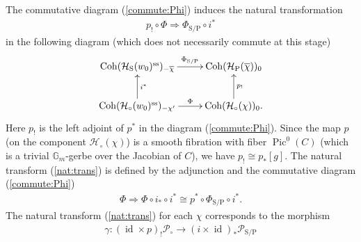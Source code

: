 \documentclass[11pt,oneside,a4paper,mathscr]{amsart}
\theoremstyle{definition}
\newcommand{\Pic}{\operatorname{Pic}}
\newcommand{\cH}{\mathcal{H}}
\newcommand{\cP}{\mathcal{P}}
\newcommand{\Coh}{\operatorname{Coh}}
\newcommand{\id}{\operatorname{id}}
\newcommand{\rS}{\mathrm{S}}
\newcommand{\rP}{\mathrm{P}}
\begin{document}
The commutative diagram (\ref{commute:Phi})
induces the 
natural transformation 
\begin{align}\label{nat:trans}
     p_{!}\circ \Phi \Rightarrow \Phi_{\rS/\rP} \circ i^*
\end{align}
in the following diagram (which does not necessarily commute at this stage)
\begin{align}\label{dia:!}
    \xymatrix{
\Coh(\cH_{\rS}(w_0)^{\mathrm{ss}})_{-\overline{\chi}} \ar[r]^-{\Phi_{\rS/\rP}} & \Coh(\cH_{\rP}(\overline{\chi}))_0 \\
\Coh(\cH_{\circ}(w_0)^{\mathrm{ss}})_{-\chi'} \ar[r]^-{\Phi} \ar[u]_-{i^{*}} 
& \Coh(\cH_{\circ}(\chi))_0 \ar[u]_-{p_{!}}.
    }
\end{align}
Here $p_{!}$ is the left adjoint of $p^*$ in the diagram (\ref{commute:Phi}). 
Since the map $p$ (on the component $\cH_{\circ}(\chi)$) is a smooth fibration 
with fiber $\Pic^0(C)$ (which is a trivial $\mathbb{G}_m$-gerbe over the Jacobian of $C$), we have $p_{!}\cong p_{*}[g]$. 
The natural transform (\ref{nat:trans}) is defined 
by the adjunction and the commutative diagram (\ref{commute:Phi})
\begin{align*}
    \Phi \Rightarrow \Phi \circ i_{*} \circ i^* \cong p^* \circ \Phi_{\rS/\rP} \circ i^*. 
\end{align*}
The natural transform (\ref{nat:trans}) for each $\chi$ 
corresponds to the morphism 
\begin{align}\label{gamma}
\gamma \colon
    (\id \times p)_{!}\cP_{\circ} \to (i\times \id)_{*}\cP_{\rS/\rP}
\end{align}
\end{document}
